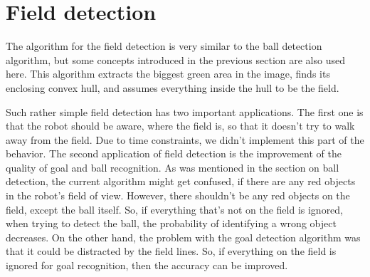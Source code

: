 \section{Field detection}

The algorithm for the field detection is very similar to the ball detection
algorithm, but some concepts introduced in the previous section are also used
here. This algorithm extracts the biggest green area in the image, finds its
enclosing convex hull, and assumes everything inside the hull to be the field.

Such rather simple field detection has two important applications. The first
one is that the robot should be aware, where the field is, so that it doesn't
try to walk away from the field. Due to time constraints, we didn't implement
this part of the behavior. The second application of field detection is the
improvement of the quality of goal and ball recognition. As was mentioned in
the section on ball detection, the current algorithm might get confused, if
there are any red objects in the robot's field of view. However, there
shouldn't be any red objects on the field, except the ball itself. So, if
everything that's not on the field is ignored, when trying to detect the ball,
the probability of identifying a wrong object decreases. On the other hand, the
problem with the goal detection algorithm was that it could be distracted by
the field lines. So, if everything on the field is ignored for goal
recognition, then the accuracy can be improved.
